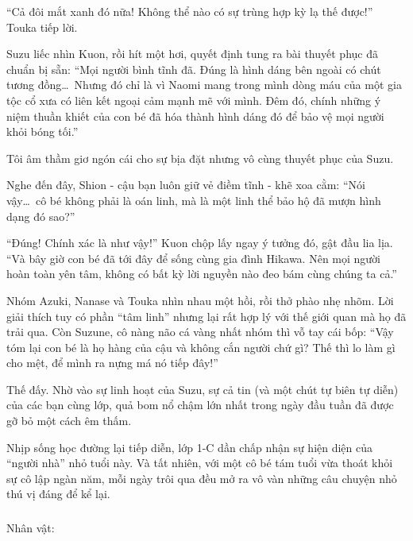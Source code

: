 \documentclass[../main.tex]{subfiles}
\begin{document}
``Cả đôi mắt xanh đó nữa! Không thể nào có sự trùng hợp kỳ lạ thế được!'' Touka tiếp lời.

Suzu liếc nhìn Kuon, rồi hít một hơi, quyết định tung ra bài thuyết phục đã chuẩn bị sẵn: ``Mọi người bình tĩnh đã. Đúng là hình dáng bên ngoài có chút tương đồng\dots\ Nhưng đó chỉ là vì Naomi mang trong mình dòng máu của một gia tộc cổ xưa có liên kết ngoại cảm mạnh mẽ với mình. Đêm đó, chính những ý niệm thuần khiết của con bé đã hóa thành hình dáng đó để bảo vệ mọi người khỏi bóng tối.''

Tôi âm thầm giơ ngón cái cho sự bịa đặt nhưng vô cùng thuyết phục của Suzu.

Nghe đến đây, Shion - cậu bạn luôn giữ vẻ điềm tĩnh - khẽ xoa cằm: ``Nói vậy\dots\ cô bé không phải là oán linh, mà là một linh thể bảo hộ đã mượn hình dạng đó sao?''

``Đúng! Chính xác là như vậy!'' Kuon chộp lấy ngay ý tưởng đó, gật đầu lia lịa. ``Và bây giờ con bé đã tới đây để sống cùng gia đình Hikawa. Nên mọi người hoàn toàn yên tâm, không có bất kỳ lời nguyền nào đeo bám cùng chúng ta cả.''

Nhóm Azuki, Nanase và Touka nhìn nhau một hồi, rồi thở phào nhẹ nhõm. Lời giải thích tuy có phần ``tâm linh'' nhưng lại rất hợp lý với thế giới quan mà họ đã trải qua. Còn Suzune, cô nàng não cá vàng nhất nhóm thì vỗ tay cái bốp: ``Vậy tóm lại con bé là họ hàng của cậu và không cắn người chứ gì? Thế thì lo làm gì cho mệt, để mình ra nựng má nó tiếp đây!''

Thế đấy. Nhờ vào sự linh hoạt của Suzu, sự cả tin (và một chút tự biên tự diễn) của các bạn cùng lớp, quả bom nổ chậm lớn nhất trong ngày đầu tuần đã được gỡ bỏ một cách êm thấm.

Nhịp sống học đường lại tiếp diễn, lớp 1-C dần chấp nhận sự hiện diện của ``người nhà'' nhỏ tuổi này. Và tất nhiên, với một cô bé tám tuổi vừa thoát khỏi sự cô lập ngàn năm, mỗi ngày trôi qua đều mở ra vô vàn những câu chuyện nhỏ thú vị đáng để kể lại.

\newpage

\subsubsection*{\label{ep-ER1}}
\begin{center}{\caviar Nhân vật:  }\end{center}
\end{document}
